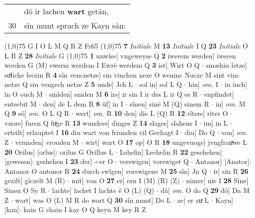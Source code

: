\documentclass[8pt,a4paper,notitlepage]{article}
\begin{document}
\begin{table}[ht]
\begin{minipage}[t]{0.5\linewidth}
\begin{tabular}{rl}
 & dô ir lachen \textbf{wart} getân,\\ 
30 & sîn munt sprach ze Kayn sân:\\ 
\end{tabular}
\scriptsize
\line(1,0){75} \newline
G I O L M Q R Z Fr65 \newline
\line(1,0){75} \newline
\textbf{7} \textit{Initiale} M  \textbf{13} \textit{Initiale} I Q  \textbf{23} \textit{Initiale} O L R Z  \textbf{28} \textit{Initiale} G  \newline
\line(1,0){75} \newline
\textbf{1} unwîse] vngeweyse Q \textbf{2} iwerem werden] iweren werden G (M) ewerm werdem I Ewrē werdem Q \textbf{3} ist] Wirt O Q  $\cdot$ smæhiu letze] soͯliche leczin R \textbf{4} sîn vencnetze] sin vinchen neze O weninc Nucze M sint vinc netze Q sin vengech netze Z \textbf{5} unde] Jch L  $\cdot$ sol in] sol L Q  $\cdot$ hin] \textit{om.} I  $\cdot$ in iuch] în O ouch M  $\cdot$ smîden] sniden M \textbf{6} irs] ir sin I ir des L ir Q es R  $\cdot$ enpfindet] entsebit M  $\cdot$ den] dē L dem R \textbf{8} ûf] in I  $\cdot$ sînen] sinē M (Q) sinem R  $\cdot$ in] \textit{om.} M Q \textbf{9} sô] \textit{om.} O L Q R  $\cdot$ wert] \textit{om.} R \textbf{10} den] die L (Q) R \textbf{12} rîters] riter O  $\cdot$ vuore] furen Q fuͦge R \textbf{13} wunders] dinges Z \textbf{14} slages] slahens I  $\cdot$ im] in L  $\cdot$ erteilt] erlauptet I \textbf{16} diu wart von friunden vil Gechagt I  $\cdot$ diu] Do Q  $\cdot$ von] \textit{om.} Z  $\cdot$ vriunden] vrouden M  $\cdot$ wirt] wart O \textbf{17} op] O R \textbf{18} ungevuoge] jvngfrauͯwe L \textbf{20} Orilus] [orlus]: orilus G Orillus L  $\cdot$ Lehelin] Lechelin R \textbf{22} geschehen] [gewesen]: geshehen I \textbf{23} der] ÷er O  $\cdot$ verswigen] vorswiget Q  $\cdot$ Antanor] [Anator]: Antanor O antonor R \textbf{24} durch swîgen] vorswigene M \textbf{25} sîn] Jn Q  $\cdot$ ir] sin R \textbf{26} gezilt] giczelt M (R)  $\cdot$ mit] von O \textbf{27} er] ern I (M) (R) (Z)  $\cdot$ nimer] nie I \textbf{28} Sine] Sinen O Sy R  $\cdot$ lachte] lachet I lachte ê O (L) (Q)  $\cdot$ dâ] \textit{om.} O do Q \textbf{29} dô] Da M Z  $\cdot$ wart] was O (L) M R do wart Q \textbf{30} sîn munt] Do L  $\cdot$ ze] er zuͯ L  $\cdot$ Kayn] [kan]: kain G chain I kay O Q keyn M key R Z \newline
\end{minipage}
\hspace{0.5cm}
\begin{minipage}[t]{0.5\linewidth}

\end{minipage}
\end{table}
\end{document}
